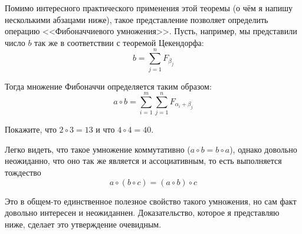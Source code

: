 Помимо интересного практического применения этой теоремы (о чём я напишу несколькими абзацами ниже), такое представление позволяет определить операцию <<Фибоначчиевого умножения>>. Пусть, например, мы представили число $b$ так же в соответствии с теоремой Цекендорфа:
$$b = \sum_{j=1}^n F_{\beta_j}$$

Тогда множение Фибоначчи определяется таким образом:
$$a\circ b = \sum_{i=1}^m\sum_{j=1}^n F_{\alpha_i+\beta_j}$$

\begin{exercise}
Покажите, что $2\circ3 = 13$ и что $4\circ4 = 40$.
\end{exercise}

Легко видеть, что такое умножение коммутативно ($a\circ b = b\circ a$), однако довольно неожиданно, что оно так же является и ассоциативным, то есть выполняется тождество
$$a\circ(b\circ c) = (a\circ b)\circ c$$

Это в общем-то единственное полезное свойство такого умножения, но сам факт довольно интересен и неожиданнен. Доказательство, которое я представляю ниже, сделает это утверждение очевидным.

